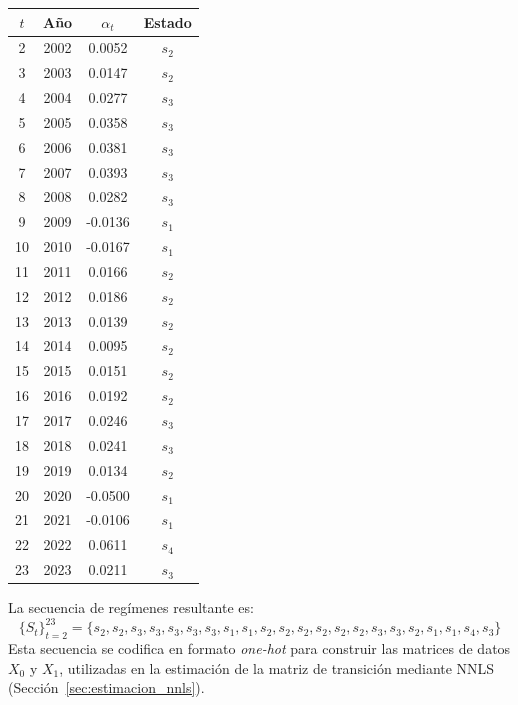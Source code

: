 \begin{examplex}
\begin{center}
\begin{tabular}{c|c|c|c}
\(t\) & Año & \(\alpha_t\) & Estado \\
\hline
2  & 2002 & 0.0052 & \(s_2\) \\
3  & 2003 & 0.0147 & \(s_2\) \\
4  & 2004 & 0.0277 & \(s_3\) \\
5  & 2005 & 0.0358 & \(s_3\) \\
6  & 2006 & 0.0381 & \(s_3\) \\
7  & 2007 & 0.0393 & \(s_3\) \\
8  & 2008 & 0.0282 & \(s_3\) \\
9  & 2009 & -0.0136 & \(s_1\) \\
10 & 2010 & -0.0167 & \(s_1\) \\
11 & 2011 & 0.0166 & \(s_2\) \\
12 & 2012 & 0.0186 & \(s_2\) \\
13 & 2013 & 0.0139 & \(s_2\) \\
14 & 2014 & 0.0095 & \(s_2\) \\
15 & 2015 & 0.0151 & \(s_2\) \\
16 & 2016 & 0.0192 & \(s_2\) \\
17 & 2017 & 0.0246 & \(s_3\) \\
18 & 2018 & 0.0241 & \(s_3\) \\
19 & 2019 & 0.0134 & \(s_2\) \\
20 & 2020 & -0.0500 & \(s_1\) \\
21 & 2021 & -0.0106 & \(s_1\) \\
22 & 2022 & 0.0611 & \(s_4\) \\
23 & 2023 & 0.0211 & \(s_3\) \\
\end{tabular}
\end{center}

La secuencia de regímenes resultante es:
\[
\{S_t\}_{t=2}^{23} = \{s_2, s_2, s_3, s_3, s_3, s_3, s_3, s_1, s_1, s_2, s_2, s_2, s_2, s_2, s_2, s_3, s_3, s_2, s_1, s_1, s_4, s_3\}
\]
Esta secuencia se codifica en formato \textit{one-hot} para construir las matrices de datos \(X_0\) y \(X_1\), utilizadas en la estimación de la matriz de transición mediante NNLS (Sección~\ref{sec:estimacion_nnls}).
\end{examplex}


